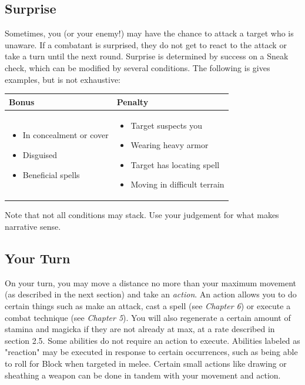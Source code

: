\documentclass[12pt]{book}
\begin{document}
\subsection{Surprise}

Sometimes, you (or your enemy!) may have the chance to attack a target who is unaware. If a combatant is surprised, they do not get to react to the attack or take a turn until the next round. Surprise is determined by success on a Sneak check, which can be modified by several conditions. The following is gives examples, but is not exhaustive:

\begin{tabular}{p{}|p{}}

Bonus & Penalty\\ \hline
	\begin{itemize}
		\item In concealment or cover
		\item Disguised
		\item Beneficial spells
	\end{itemize}
	&
	\begin{itemize}
		\item Target suspects you
		\item Wearing heavy armor
		\item Target has locating spell
		\item Moving in difficult terrain
	\end{itemize}\\

\end{tabular}

Note that not all conditions may stack. Use your judgement for what makes narrative sense.

\subsection{Your Turn}
On your turn, you may move a distance no more than your maximum movement (as described in the next section) and take an \textit{action}. An action allows you to do certain things such as make an attack, cast a spell (see \textit{Chapter 6}) or execute a combat technique (see \textit{Chapter 5}). You will also regenerate a certain amount of stamina and magicka if they are not already at max, at a rate described in section 2.5. Some abilities do not require an action to execute. Abilities labeled as "reaction" may be executed in response to certain occurrences, such as being able to roll for Block when targeted in melee. Certain small actions like drawing or sheathing a weapon can be done in tandem with your movement and action.
\end{document}
